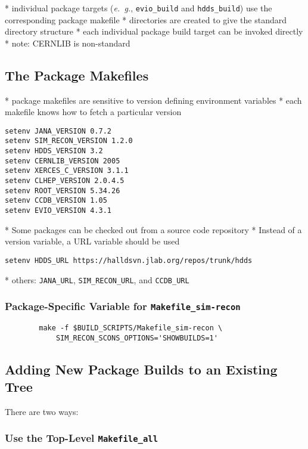 \documentclass[12pt]{article}
\begin{document}
* individual package targets ({\it e.~g.}, {\tt evio\_build}
and {\tt hdds\_build}) use the corresponding package makefile
* directories are created to give the standard directory structure
* each individual package build target can be invoked directly
* note: CERNLIB is non-standard

\subsection{The Package Makefiles}\label{section:package-makefiles}

* package makefiles are sensitive to version defining environment variables
* each makefile knows how to fetch a particular version

\begin{verbatim}
setenv JANA_VERSION 0.7.2
setenv SIM_RECON_VERSION 1.2.0
setenv HDDS_VERSION 3.2
setenv CERNLIB_VERSION 2005
setenv XERCES_C_VERSION 3.1.1
setenv CLHEP_VERSION 2.0.4.5
setenv ROOT_VERSION 5.34.26
setenv CCDB_VERSION 1.05
setenv EVIO_VERSION 4.3.1
\end{verbatim}

* Some packages can be checked out from a source code repository
* Instead of a version variable, a URL variable should be used

\begin{verbatim}
setenv HDDS_URL https://halldsvn.jlab.org/repos/trunk/hdds
\end{verbatim}

* others: {\tt JANA\_URL}, {\tt SIM\_RECON\_URL}, and {\tt CCDB\_URL}

\subsubsection{Package-Specific Variable for {\tt Makefile\_sim-recon}}

\begin{verbatim}
        make -f $BUILD_SCRIPTS/Makefile_sim-recon \
            SIM_RECON_SCONS_OPTIONS='SHOWBUILDS=1'
\end{verbatim}

\subsection{Adding New Package Builds to an Existing Tree}\label{section:adding-packages}

There are two ways:

\subsubsection{Use the Top-Level {\tt Makefile\_all}}
\end{document}
